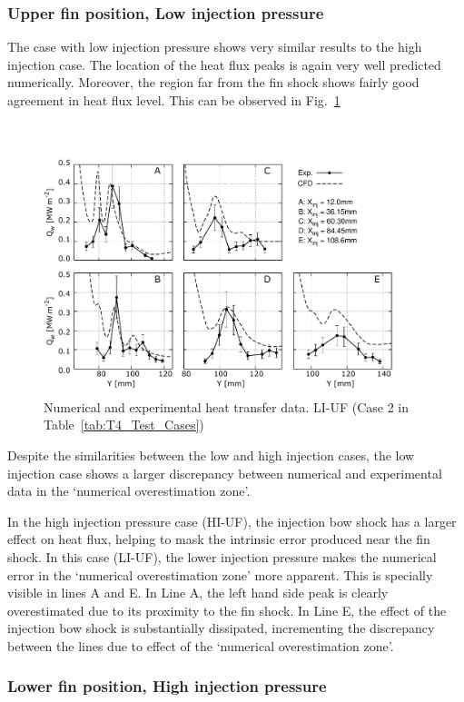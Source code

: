 \documentclass{AIAA}
\begin{document}
\subsubsection{Upper fin position, Low injection pressure}

The case with low injection pressure shows very similar results to the high injection case. The location of the heat flux peaks is again very well predicted numerically. Moreover, the region far from the fin shock shows fairly good agreement in heat flux level.
This can be observed in Fig.~\ref{fig:HeatFluxLPLIUF}

\begin{figure}[!h]
\center
\includegraphics[trim = 0mm 3mm 25mm 25mm, clip, width=0.60\columnwidth,valign=t,fbox]{Figures/Data/LP_LI_UF/GNUP_CFD_GaugesLines_Multi.pdf}
\caption{Numerical and experimental heat transfer data. LI-UF (Case 2 in Table~\ref{tab:T4_Test_Cases})}
\label{fig:HeatFluxLPLIUF}
\end{figure} 
%

Despite the similarities between the low and high injection cases, the low injection case shows a larger discrepancy between numerical and experimental data in the `numerical overestimation zone'. 

In the high injection pressure case (HI-UF), the injection bow shock has a larger effect on heat flux, helping to mask the intrinsic error produced near the fin shock. In this case (LI-UF), the lower injection pressure makes the numerical error in the `numerical overestimation zone' more apparent. This is specially visible in lines A and E. In Line A, the left hand side peak is clearly overestimated due to its proximity to the fin shock. In Line E, the effect of the injection bow shock is substantially dissipated, incrementing the discrepancy between the lines due to effect of the `numerical overestimation zone'.

\subsubsection{Lower fin position, High injection pressure}
\end{document}
